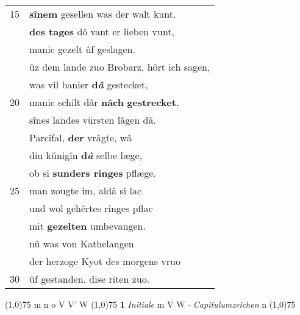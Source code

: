 \documentclass[8pt,a4paper,notitlepage]{article}
\begin{document}
\begin{table}[ht]
\begin{minipage}[t]{0.5\linewidth}
\begin{tabular}{rl}
15 & \textbf{sînem} gesellen was der walt kunt.\\ 
 & \textbf{des tages} dô vant er lieben vunt,\\ 
 & manic gezelt ûf geslagen.\\ 
 & ûz dem lande zuo Brobarz, hôrt ich sagen,\\ 
 & was vil banier \textbf{d\textit{â}} gestecket,\\ 
20 & manic schilt dâr \textbf{nâch} \textbf{gestrecket}.\\ 
 & sînes landes vürsten lâgen dâ.\\ 
 & Parcifal, \textbf{der} vrâgte, wâ\\ 
 & diu künigîn \textbf{d\textit{â}} selbe læge,\\ 
 & ob si \textbf{sunders ringes} pflæge.\\ 
25 & man zougte im, aldâ si lac\\ 
 & und wol gehêrtes ringes pflac\\ 
 & mit \textbf{gezelten} umbevangen.\\ 
 & nû was von Kathelangen\\ 
 & der herzoge Kyot des morgens vruo\\ 
30 & ûf gestanden. dise riten zuo.\\ 
\end{tabular}
\scriptsize
\line(1,0){75} \newline
m n o V V' W \newline
\line(1,0){75} \newline
\textbf{1} \textit{Initiale} m V W   $\cdot$ \textit{Capitulumzeichen} n  \newline
\line(1,0){75} \newline

\end{minipage}
\end{table}
\end{document}
